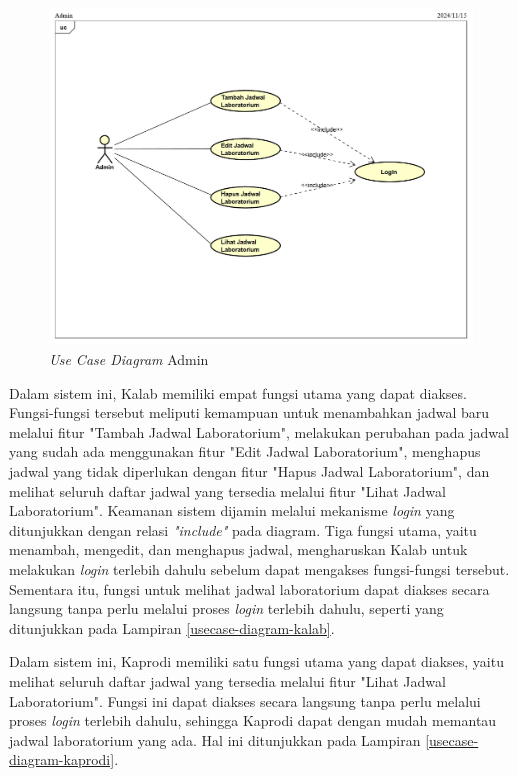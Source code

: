 \begin{figure}
	\centering
	\includegraphics[width=1\textwidth]{konten/gambar/usecase-diagram/admin.png}
	\caption{\textit{Use Case Diagram} Admin}
	\label{usecase-diagram-admin}
\end{figure}

Dalam sistem ini, Kalab memiliki empat fungsi utama yang dapat diakses. Fungsi-fungsi tersebut meliputi kemampuan untuk menambahkan jadwal baru melalui fitur "Tambah Jadwal Laboratorium", melakukan perubahan pada jadwal yang sudah ada menggunakan fitur "Edit Jadwal Laboratorium", menghapus jadwal yang tidak diperlukan dengan fitur "Hapus Jadwal Laboratorium", dan melihat seluruh daftar jadwal yang tersedia melalui fitur "Lihat Jadwal Laboratorium". Keamanan sistem dijamin melalui mekanisme \textit{login} yang ditunjukkan dengan relasi \textit{"include"} pada diagram. Tiga fungsi utama, yaitu menambah, mengedit, dan menghapus jadwal, mengharuskan Kalab untuk melakukan \textit{login} terlebih dahulu sebelum dapat mengakses fungsi-fungsi tersebut. Sementara itu, fungsi untuk melihat jadwal laboratorium dapat diakses secara langsung tanpa perlu melalui proses \textit{login} terlebih dahulu, seperti yang ditunjukkan pada Lampiran \ref{usecase-diagram-kalab}.

Dalam sistem ini, Kaprodi memiliki satu fungsi utama yang dapat diakses, yaitu melihat seluruh daftar jadwal yang tersedia melalui fitur "Lihat Jadwal Laboratorium". Fungsi ini dapat diakses secara langsung tanpa perlu melalui proses \textit{login} terlebih dahulu, sehingga Kaprodi dapat dengan mudah memantau jadwal laboratorium yang ada. Hal ini ditunjukkan pada Lampiran \ref{usecase-diagram-kaprodi}.

